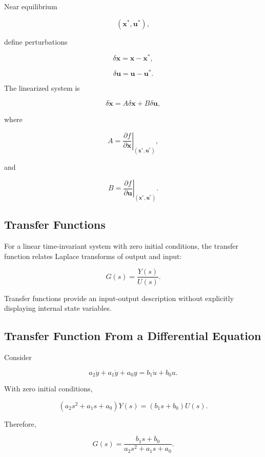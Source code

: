 Near equilibrium

\[
(\mathbf{x}^*,\mathbf{u}^*),
\]

define perturbations

\[
\delta\mathbf{x}
=
\mathbf{x}-\mathbf{x}^*,
\]

\[
\delta\mathbf{u}
=
\mathbf{u}-\mathbf{u}^*.
\]

The linearized system is

\[
\boxed{
\delta\dot{\mathbf{x}}
=
A\delta\mathbf{x}
+
B\delta\mathbf{u},
}
\]

where

\[
\boxed{
A
=
\left.
\frac{\partial f}{\partial\mathbf{x}}
\right|_{(\mathbf{x}^*,\mathbf{u}^*)},
}
\]

and

\[
\boxed{
B
=
\left.
\frac{\partial f}{\partial\mathbf{u}}
\right|_{(\mathbf{x}^*,\mathbf{u}^*)}.
}
\]

\subsection{Transfer Functions}
\label{subsec:control-transfer-functions}

For a linear time-invariant system with zero initial conditions, the transfer
function relates Laplace transforms of output and input:

\[
\boxed{
G(s)
=
\frac{Y(s)}{U(s)}.
}
\]

Transfer functions provide an input-output description without explicitly
displaying internal state variables.

\subsection{Transfer Function From a Differential Equation}
\label{subsec:transfer-function-differential-equation}

Consider

\[
a_2\ddot{y}
+
a_1\dot{y}
+
a_0y
=
b_1\dot{u}
+
b_0u.
\]

With zero initial conditions,

\[
(a_2s^2+a_1s+a_0)Y(s)
=
(b_1s+b_0)U(s).
\]

Therefore,

\[
\boxed{
G(s)
=
\frac{b_1s+b_0}
{a_2s^2+a_1s+a_0}.
}
\]

